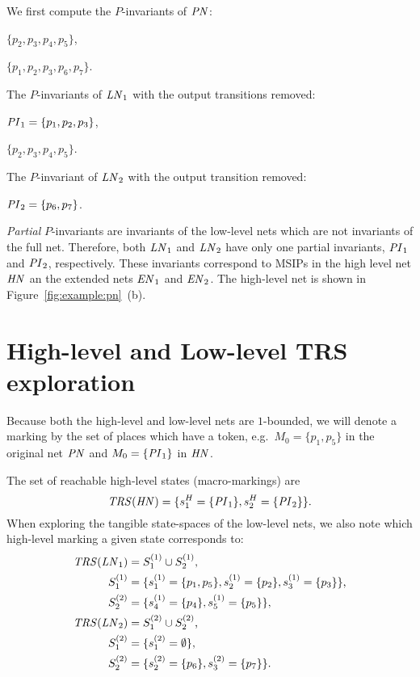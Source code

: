 \documentclass[a4paper,10pt,twoside,openright]{memoir}
\newcommand*{\PN}{\textnormal{\emph{PN}}}
\newcommand*{\LN}{\textnormal{\emph{LN}}}
\newcommand*{\HN}{\textnormal{\emph{HN}}}
\newcommand*{\EN}{\textnormal{\emph{EN}}}
\newcommand*{\PI}{\textnormal{\emph{PI}}}
\newcommand*{\TRS}{\textnormal{\emph{TRS}}}
\begin{document}
We first compute the $P$-invariants of $\PN$:
\begin{itemize*}
\item $\{p_2, p_3, p_4, p_5\}$,
\item $\{p_1, p_2, p_3, p_6, p_7\}$.
\end{itemize*}
The $P$-invariants of $\LN_1$ with the output transitions removed:
\begin{itemize*}
\item $\PI_1 = \{p_1, p_2, p_3\}$,
\item $\{p_2, p_3, p_4, p_5\}$.
\end{itemize*}
The $P$-invariant of $\LN_2$ with the output transition removed:
\begin{itemize*}
\item $\PI_2 = \{p_6, p_7\}$.
\end{itemize*}

\emph{Partial} $P$-invariants are invariants of the low-level nets
which are not invariants of the full net. Therefore, both $\LN_1$ and
$\LN_2$ have only one partial invariants, $\PI_1$ and $\PI_2$,
respectively. These invariants correspond to MSIPs in the high level
net $\HN$ an the extended nets $\EN_1$ and $\EN_2$. The high-level net
is shown in Figure~\ref{fig:example:pn}~(b).

\section{High-level and Low-level TRS exploration}

Because both the high-level and low-level nets are $1$-bounded, we
will denote a marking by the set of places which have a token,
e.g.~$M_0 = \{p_1, p_5\}$ in the original net $\PN$ and $M_0 =
\{\PI_1\}$ in $\HN$.

The set of reachable high-level states (macro-markings) are
\begin{equation*}
  \TRS(\HN) = \{s^H_1 = \{\PI_1\}, s^H_2 = \{\PI_2\}\} \text.
\end{equation*}
When exploring the tangible state-spaces of the low-level nets, we
also note which high-level marking a given state corresponds to:
\begin{align*}
  \TRS(\LN_1) &= S^{(1)}_1 \cup S^{(1)}_2 \text, \\
  S^{(1)}_1 &= \{s^{(1)}_{1} = \{p_1, p_5\}, s^{(1)}_{2} = \{p_2\},
              s^{(1)}_{3} = \{p_3\}\} \text, \\
  S^{(2)}_2 &= \{s^{(1)}_{4} = \{p_4\}, s^{(1)}_{5} = \{p_5\}\} \text,
  \\
  \TRS(\LN_2) &= S^{(2)}_1 \cup S^{(2)}_2 \text, \\
  S^{(2)}_1 &= \{s^{(2)}_{1} = \emptyset\} \text, \\
  S^{(2)}_2 &= \{s^{(2)}_{2} = \{p_6\}, s^{(2)}_{3} = \{p_7\}\} \text.
\end{align*}
\end{document}
